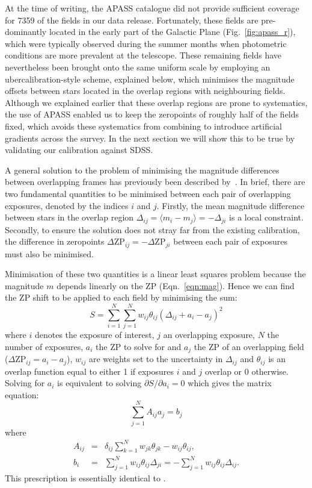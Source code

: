 \documentclass[useAMS,usenatbib]{mn2e}
\begin{document}
At the time of writing, the APASS catalogue did not provide 
sufficient coverage for 7359 of the fields in our data release.
Fortunately, these fields are pre-dominantly located 
in the early part of the Galactic Plane (Fig.~\ref{fig:apass_r}),
which were typically observed during the summer months
when photometric conditions are more prevalent at the telescope.
These remaining fields have nevertheless 
been brought onto the same uniform scale 
by employing an ubercalibration-style scheme, explained below,
which minimises the magnitude offsets between stars
located in the overlap regions with neighbouring fields.
Although we explained earlier that these overlap regions
are prone to systematics, the use of APASS enabled us to
keep the zeropoints of roughly half of the fields fixed,
which avoids these systematics from combining to introduce
artificial gradients across the survey.
In the next section we will show this to be true by validating
our calibration against SDSS.

A general solution to the problem of minimising the magnitude
differences between overlapping frames has previously been
described by~\citet{Glazebrook1994}.
In brief, there are two fundamental quantities to be
minimised between each pair of overlapping exposures, 
denoted by the indices $i$ and $j$. 
Firstly, the mean magnitude difference between stars in the overlap
region $\Delta_{ij}=\langle m_i-m_j\rangle=-\Delta_{ji}$ is a local
constraint. 
Secondly, to ensure the solution does not stray far 
from the existing calibration, 
the difference in zeropoints 
$\Delta\mathrm{ZP}_{ij}=-\Delta\mathrm{ZP}_{ji}$ 
between each pair of exposures must also be minimised.

Minimisation of these two quantities is a linear least squares problem 
because the magnitude $m$ depends linearly on the ZP (Eqn.~\ref{eqn:mag}).
Hence we can find the ZP shift to be applied to each field 
by minimising the sum:
\begin{equation}
   S = \sum_{i=1}^N \sum_{j=1}^N w_{ij} \theta_{ij} (\Delta_{ij} + a_i - a_j)^2
   \label{eqn:chi2}
\end{equation}
where $i$ denotes the exposure of interest, 
$j$ an overlapping exposure, 
$N$ the number of exposures,
$a_i$ the ZP to solve for 
and $a_j$ the ZP of an overlapping field ($\Delta\mathrm{ZP}_{ij}=a_i-a_j$), 
$w_{ij}$ are weights set to the uncertainty in $\Delta_{ij}$
and $\theta_{ij}$ is an overlap function 
equal to either 1 if exposures $i$ and $j$ overlap or 0 otherwise. 
Solving for $a_i$ is equivalent to solving $\partial
S/\partial a_i=0$ which gives the matrix equation:
\begin{equation}
   \sum_{j=1}^N A_{ij} a_j = b_j
   \label{eqn:matrix}
\end{equation}
where 
\begin{eqnarray}
   A_{ij} &=& \delta_{ij} \sum_{k=1}^N w_{jk}\theta_{jk} - w_{ij} \theta_{ij},\label{eqn:aij}\\
   b_i &=& \sum_{j=1}^N w_{ij} \theta_{ij}\Delta_{ji} = -\sum_{j=1}^N w_{ij} \theta_{ij}\Delta_{ij}.\label{eqn:bi}
\end{eqnarray}
This prescription is essentially identical to \citet{Glazebrook1994}.
\end{document}
